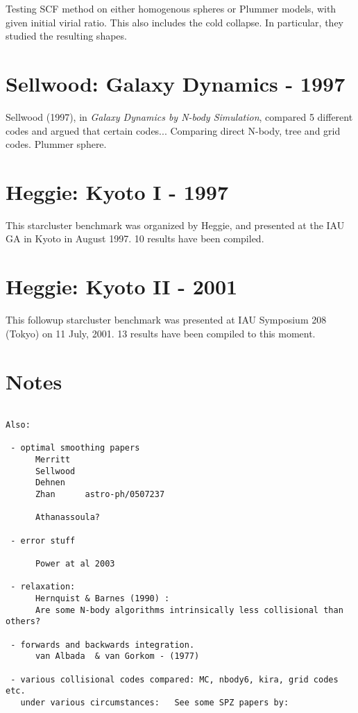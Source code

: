 \begin{itemize}
\begin{itemize}
Testing SCF method on either homogenous spheres or Plummer models, with
given initial virial ratio. This also includes the cold collapse. In
particular, they studied the resulting shapes.

\section{Sellwood: Galaxy Dynamics - 1997}

Sellwood (1997), in {\it Galaxy Dynamics by N-body Simulation},
compared 5 different codes and argued that certain codes...
Comparing direct N-body, tree and grid codes. Plummer
sphere.


\section{Heggie: Kyoto I - 1997}

This starcluster benchmark was 
organized by Heggie, and presented at the IAU GA in Kyoto in August 1997. 10 results
have been compiled.

\section{Heggie: Kyoto II - 2001}

This followup starcluster benchmark was 
presented at IAU Symposium 208 (Tokyo) on 11 July, 2001. 13 results
have been compiled to this moment.

\section{Notes}
\begin{verbatim}

Also:

 - optimal smoothing papers
      Merritt
      Sellwood
      Dehnen
      Zhan      astro-ph/0507237

      Athanassoula?

 - error stuff

      Power at al 2003

 - relaxation:
      Hernquist & Barnes (1990) : 
      Are some N-body algorithms intrinsically less collisional than others?

 - forwards and backwards integration. 
      van Albada  & van Gorkom - (1977)

 - various collisional codes compared: MC, nbody6, kira, grid codes etc.
   under various circumstances:   See some SPZ papers by:


\end{verbatim}
\end{itemize}
\end{itemize}
